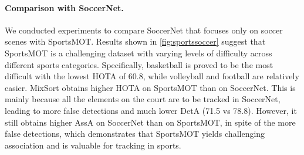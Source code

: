 \documentclass[10pt,twocolumn,letterpaper]{article}
\begin{document}
\paragraph{Comparison with SoccerNet.}
We conducted experiments to compare SoccerNet that focuses only on soccer scenes with SportsMOT. Results shown in \cref{fig:sportssoccer} suggest that SportsMOT is a challenging dataset with varying levels of difficulty across different sports categories. Specifically, basketball is proved to be the most difficult with the lowest HOTA of 60.8, while volleyball and football are relatively easier. 
MixSort obtains higher HOTA on SportsMOT than on SoccerNet. This is mainly because all the elements on the court are to be tracked in SoccerNet, leading to more false detections and much lower DetA (71.5 vs 78.8). However, it still obtains higher AssA on SoccerNet than on SportsMOT, in spite of the more false detections, which demonstrates that SportsMOT yields challenging association and is valuable for tracking in sports.
\begin{table}[pt]
\vspace{-3mm}
\caption{Results of MixSort-Byte on SportsMOT and SoccerNet test set. The models are trained on SportsMOT training and validation set and SoccerNet training set respectively and the hyper-parameters are the same. }
\label{fig:sportssoccer}
\end{table}

\vspace{-3mm}
\end{document}
